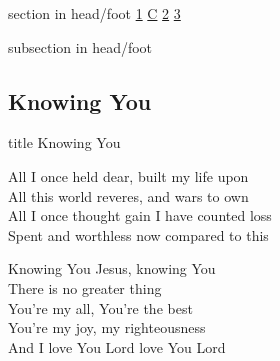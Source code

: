 \documentclass{beamer}
\begin{document}
{
{ 
 {
 \begin{beamercolorbox}[ht=4.5ex,dp=1.5ex,%
      leftskip=.3cm,rightskip=.3cm plus1fil]{section in head/foot}
 \fontsize{12}{25}\selectfont 
\hyperlink{Knowing You['All I once held dear']1}{1}
\hyperlink{Knowing You['All I once held dear']C}{C}
\hyperlink{Knowing You['All I once held dear']2}{2}
\hyperlink{Knowing You['All I once held dear']3}{3}
 
 \end{beamercolorbox}%
  \begin{beamercolorbox}[ht=2.5ex,dp=1.125ex,%
   leftskip=.3cm,rightskip=.3cm plus1fil]{subsection in head/foot}
   \insertauthor
 \end{beamercolorbox}%
 }
}
\subsection{ Knowing You }

\hypertarget{Knowing You['All I once held dear']}{}
\begin{frame}{}
 \vfill
  \centering
  \begin{beamercolorbox}[sep=8pt,center,shadow=true,rounded=true]{title}
    Knowing You    
  \end{beamercolorbox}
  \vfill
\end{frame}

\hypertarget{Knowing You['All I once held dear']1}{}
\begin{frame}{}
\fontsize{ 18 }{ 23 }\selectfont

All I once held dear, built my life upon\\ 
All this world reveres, and wars to own\\ 
All I once thought gain I have counted loss\\ 
Spent and worthless now compared to this 

\end{frame}

\hypertarget{Knowing You['All I once held dear']C}{}
\begin{frame}{}
\fontsize{ 18 }{ 23 }\selectfont

Knowing You Jesus, knowing You\\ 
There is no greater thing\\ 
You're my all, You're the best\\ 
You're my joy, my righteousness\\ 
And I love You Lord love You Lord 


\end{frame}}
\end{document}
